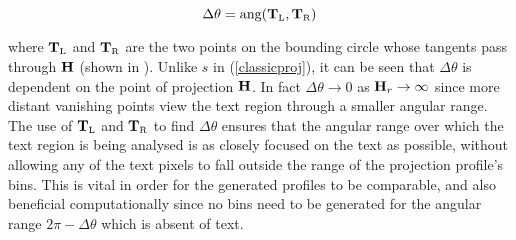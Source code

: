 \begin{equation} \Delta \theta = \mbox{ang}(\myvec{T}_{\mbox{\tiny L}},\myvec{T}_{\mbox{\tiny R}}) \end{equation}

{ \parindent 0mm 
where $\myvec{T}_{\mbox{\tiny L}}$ and $\myvec{T}_{\mbox{\tiny R}}$ are the two
points on the bounding circle whose tangents pass through ${ \bf H }$
(shown
in ).  Unlike $s$ in (\ref{classicproj}), it can be seen that
$\Delta \theta$ is dependent on the point of projection ${ \bf H }$.  In fact
$\Delta \theta \rightarrow 0$ as ${ \bf H }_r \rightarrow \infty$ since more
distant vanishing points view the text region through a smaller angular range.
The use of $\myvec{T}_{\mbox{\tiny L}}$ and $\myvec{T}_{\mbox{\tiny R}}$ to find $\Delta\theta$ ensures that the angular range
over which the text region is being analysed is as closely focused on the text
as possible, without allowing any of the text pixels to fall outside the range
of the projection profile's bins.  This is vital in order for the generated
profiles to be comparable, and also beneficial computationally since no bins
need to be generated for the angular range $2 {\pi}-\Delta \theta$ which is
absent of text.
}

\begin{comment}
Relative to a vanishing point $\myvec{H}$, the text region under examination
will fall entirely within a range of angles, forming an arc or wedge shape
extending from $\myvec{H}$.  The two angles which form this enclosing wedge are
used as the left and right bounds of the projection profile.  Hence all pixels
in the text region will map correctly to a bin in the projection profile, whilst
ensuring that the text fully spans the projection and a useful profile is
obtained.  Without this resizing of the window over which to collect the
projection profile for each vanishing point, the profiles obtained will not
relate to each other.  This is because more distant vanishing points find the
text lying within a smaller angular range, which will produce a drastically
different projection unless we focus on the relevant range.
\end{comment}

